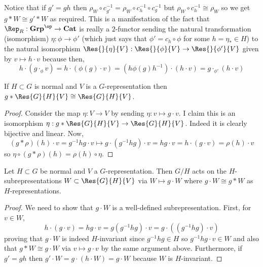 \documentclass[12pt]{article}
\begin{document}
\begin{rmk}
Notice that if $g' = g h$ then $\rho_W \circ c_{g'}^{-1} = \rho_W \circ c_h^{-1} \circ c_g^{-1}$ but $\rho_W \circ c_h^{-1} \cong \rho_W$ so we get $g * W \cong g' * W$ as required. This is a manifestation of the fact that $\Rep_R : \mathbf{Grp}^\op \to \mathbf{Cat}$ is really a $2$-functor sending the natural transformation (isomorphism) $\eta : \phi \to \phi'$ (which just says that $\phi' = c_h \circ \phi$ for some $h = \eta_* \in H$) to the natural isomorphism $\Res{}{\eta}{V} : \Res{}{\phi}{V} \to \Res{}{\phi'}{V}$ given by $v \mapsto h \cdot v$ because then,
\[ h \cdot (g \cdot_{\phi} v) = h \cdot (\phi(g) \cdot v) = (h \phi(g) h^{-1}) \cdot (h \cdot v) = g \cdot_{\phi'} (h \cdot v) \]
\end{rmk}

\begin{prop}
If $H \subset G$ is normal and $V$ is a $G$-representation then $g * \Res{G}{H}{V} \cong \Res{G}{H}{V}$.
\end{prop}

\begin{proof}
Consider the map $\eta : V \to V$ by sending $\eta: v \mapsto g \cdot v$. I claim this is an isomorphism $\eta : g * \Res{G}{H}{V} \to \Res{G}{H}{V}$. Indeed it is clearly bijective and linear. Now,
\[ (g * \rho)(h) \cdot v = g^{-1} h g \cdot v \mapsto g \cdot (g^{-1} h g) \cdot v = hg \cdot v = h \cdot (g \cdot v) = \rho(h) \cdot v \]
so $\eta \circ (g * \rho)(h) = \rho(h) \circ \eta$. 
\end{proof}

\begin{prop}
Let $H \subset G$ be normal and $V$ a $G$-representation. Then $G / H$ acts on the $H$-subrepresentations $W \subset \Res{G}{H}{V}$ via $W \mapsto g \cdot W$ where $g \cdot W \cong g * W$ as $H$-representations.
\end{prop}

\begin{proof}
We need to show that $g \cdot W$ is a well-defined subrepresentation. First, for $v \in W$,
\[ h \cdot (g \cdot v) = hg \cdot v = g(g^{-1} h g) \cdot v = g \cdot ((g^{-1} h g) \cdot v) \]
proving that $g \cdot W$ is indeed $H$-invariant since $g^{-1} h g \in H$ so $g^{-1} h g \cdot v \in W$ and also that $g * W \cong g \cdot W$ via $v \mapsto g \cdot v$ by the same argument above. Furthermore, if $g' = gh$ then $g' \cdot W = g \cdot (h \cdot W) = g \cdot W$ because $W$ is $H$-invariant. 
\end{proof}
\end{document}
